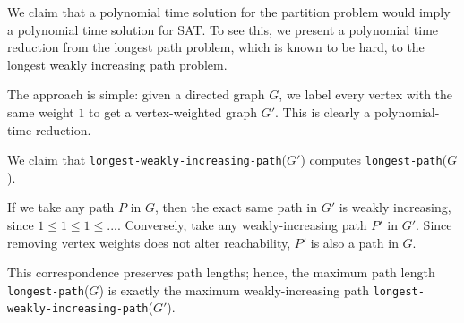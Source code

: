 \documentclass{article}
\begin{document}
\begin{solution}
We claim that a polynomial time solution for the partition problem would imply a polynomial time solution for SAT. To see this, we present a polynomial time reduction from the longest path problem, which is known to be hard, to the longest weakly increasing path problem.

The approach is simple: given a directed graph $G$, we label every vertex with the same weight $1$ to get a vertex-weighted graph $G'$. This is clearly a polynomial-time reduction.

\begin{subproof} [Correctness]
We claim that \texttt{longest-weakly-increasing-path}($G'$) computes \texttt{longest-path}($G$).

If we take any path $P$ in $G$, then the exact same path in $G'$ is weakly increasing, since $1 \leq 1 \leq 1 \leq ...$. Conversely, take any weakly-increasing path $P'$ in $G'$. Since removing vertex weights does not alter reachability, $P'$ is also a path in $G$.

This correspondence preserves path lengths; hence, the maximum path length \texttt{longest-path}($G$) is exactly the maximum weakly-increasing path \texttt{longest-weakly-increasing-path}($G'$).
\end{subproof}
\end{solution}
\pagebreak
\end{document}
